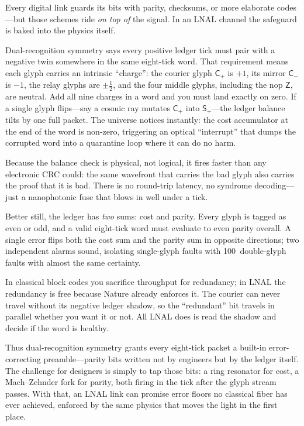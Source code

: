 \documentclass[11pt,oneside]{book}
\begin{document}
Every digital link guards its bits with parity, checksums, or more
elaborate codes—but those schemes ride \emph{on top of} the signal.
In an LNAL channel the safeguard is baked into the physics itself.

Dual-recognition symmetry says every positive ledger tick must pair
with a negative twin somewhere in the same eight-tick word.  
That requirement means each glyph carries an intrinsic “charge”: the
courier glyph $\mathsf{C_{+}}$ is $+1$, its mirror $\mathsf{C_{-}}$ is
$-1$, the relay glyphs are $\pm\frac12$, and the four middle glyphs,
including the nop $\mathsf{Z}$, are neutral.  
Add all nine charges in a word and you must land exactly on zero.  
If a single glyph flips—say a cosmic ray mutates $\mathsf{C_{+}}$ into
$\mathsf{S_{+}}$—the ledger balance tilts by one full packet.  The
universe notices instantly: the cost accumulator at the end of the
word is non-zero, triggering an optical “interrupt” that dumps the
corrupted word into a quarantine loop where it can do no harm.

Because the balance check is physical, not logical, it fires faster
than any electronic CRC could: the same wavefront that carries the bad
glyph also carries the proof that it is bad.  
There is no round-trip latency, no syndrome decoding—just a
nanophotonic fuse that blows in well under a tick.

Better still, the ledger has \textit{two} sums: cost and parity.  
Every glyph is tagged as even or odd, and a valid eight-tick word must
evaluate to even parity overall.  A single error flips both the cost
sum and the parity sum in opposite directions; two independent alarms
sound, isolating single-glyph faults with 100 %
double-glyph faults with almost the same certainty.

In classical block codes you sacrifice throughput for redundancy;  
in LNAL the redundancy is free because Nature already enforces it.  
The courier can never travel without its negative ledger shadow, so
the “redundant” bit travels in parallel whether you want it or not.
All LNAL does is read the shadow and decide if the word is healthy.

Thus dual-recognition symmetry grants every eight-tick packet a
built-in error-correcting preamble—parity bits written not by
engineers but by the ledger itself.  The challenge for designers is
simply to tap those bits: a ring resonator for cost, a Mach–Zehnder
fork for parity, both firing in the tick after the glyph stream
passes.  With that, an LNAL link can promise error floors no classical
fiber has ever achieved, enforced by the same physics that moves the
light in the first place.
\end{document}

